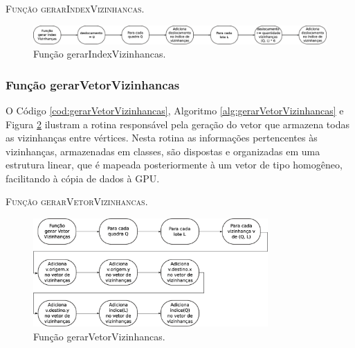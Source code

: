 

\begin{algorithm}[H]
   \SetAlgoLined   
   
   \caption{\textsc{Função gerarIndexVizinhancas.}}
   \label{alg:gerarIndexVizinhancas}
\end{algorithm}

\begin{figure}[H]
  \centering
  \includegraphics[width=1\textwidth]{Figuras/Simula/Fluxos/gerarIndexVizinhancas.eps}
  \caption{Função gerarIndexVizinhancas.}
  \label{fig:gerarIndexVizinhancas}
\end{figure} 

\newpage

\subsubsection{Função gerarVetorVizinhancas}

O Código \ref{cod:gerarVetorVizinhancas}, Algoritmo \ref{alg:gerarVetorVizinhancas} e Figura \ref{fig:gerarVetorVizinhancas} ilustram a rotina responsável pela geração do vetor que armazena todas as vizinhanças entre vértices. Nesta rotina as informações pertencentes às vizinhanças, armazenadas em classes, são dispostas e organizadas em uma estrutura linear, que é mapeada posteriormente à um vetor de tipo homogêneo, facilitando à cópia de dados à GPU.



\begin{algorithm}[H]
   \SetAlgoLined   
   
   \caption{\textsc{Função gerarVetorVizinhancas.}}
   \label{alg:gerarVetorVizinhancas}
\end{algorithm}

\begin{figure}[H]
  \centering
  \includegraphics[width=0.8\textwidth]{Figuras/Simula/Fluxos/gerarVetorVizinhancas.eps}
  \caption{Função gerarVetorVizinhancas.}
  \label{fig:gerarVetorVizinhancas}
\end{figure} 

